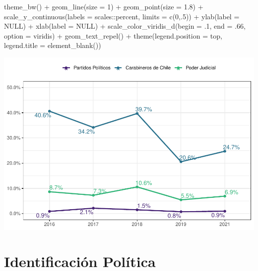 \documentclass[
  12pt,
]{book}
\newenvironment{Shaded}{\begin{snugshade}}{\end{snugshade}}
\newcommand{\AttributeTok}[1]{\textcolor[rgb]{0.77,0.63,0.00}{#1}}
\newcommand{\ConstantTok}[1]{\textcolor[rgb]{0.00,0.00,0.00}{#1}}
\newcommand{\DecValTok}[1]{\textcolor[rgb]{0.00,0.00,0.81}{#1}}
\newcommand{\FloatTok}[1]{\textcolor[rgb]{0.00,0.00,0.81}{#1}}
\newcommand{\FunctionTok}[1]{\textcolor[rgb]{0.00,0.00,0.00}{#1}}
\newcommand{\NormalTok}[1]{#1}
\newcommand{\SpecialCharTok}[1]{\textcolor[rgb]{0.00,0.00,0.00}{#1}}
\newcommand{\StringTok}[1]{\textcolor[rgb]{0.31,0.60,0.02}{#1}}
\begin{document}
\begin{Shaded}
\begin{Highlighting}[]
    \FunctionTok{theme\_bw}\NormalTok{() }\SpecialCharTok{+}  
    \FunctionTok{geom\_line}\NormalTok{(}\AttributeTok{size =} \DecValTok{1}\NormalTok{) }\SpecialCharTok{+}
    \FunctionTok{geom\_point}\NormalTok{(}\AttributeTok{size =} \FloatTok{1.8}\NormalTok{) }\SpecialCharTok{+}
    \FunctionTok{scale\_y\_continuous}\NormalTok{(}\AttributeTok{labels =}\NormalTok{ scales}\SpecialCharTok{::}\NormalTok{percent,}
                       \AttributeTok{limits =} \FunctionTok{c}\NormalTok{(}\DecValTok{0}\NormalTok{,.}\DecValTok{5}\NormalTok{)) }\SpecialCharTok{+}
    \FunctionTok{ylab}\NormalTok{(}\AttributeTok{label =} \ConstantTok{NULL}\NormalTok{) }\SpecialCharTok{+}
    \FunctionTok{xlab}\NormalTok{(}\AttributeTok{label =} \ConstantTok{NULL}\NormalTok{) }\SpecialCharTok{+}
    \FunctionTok{scale\_color\_viridis\_d}\NormalTok{(}\AttributeTok{begin =}\NormalTok{ .}\DecValTok{1}\NormalTok{, }\AttributeTok{end =}\NormalTok{ .}\DecValTok{66}\NormalTok{, }\AttributeTok{option =} \StringTok{\textquotesingle{}viridis\textquotesingle{}}\NormalTok{) }\SpecialCharTok{+}
    \FunctionTok{geom\_text\_repel}\NormalTok{() }\SpecialCharTok{+}
    \FunctionTok{theme}\NormalTok{(}\AttributeTok{legend.position =} \StringTok{\textquotesingle{}top\textquotesingle{}}\NormalTok{,}
          \AttributeTok{legend.title =} \FunctionTok{element\_blank}\NormalTok{())}
\end{Highlighting}
\end{Shaded}

\includegraphics{reporte-elsoc_files/figure-latex/unnamed-chunk-15-1.pdf}

\hypertarget{identificaciuxf3n-poluxedtica}{%
\chapter{Identificación Política}\label{identificaciuxf3n-poluxedtica}}
\end{document}
